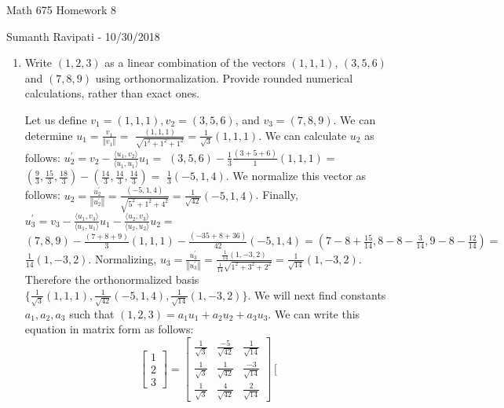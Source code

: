 \documentclass[12pt,letterpaper,reqno]{amsart}
\newcommand{\Norm}[1]{\left\Vert #1 \right \Vert}
\begin{document}
\thispagestyle{empty}
\centerline{\Large Math 675 Homework 8}
\centerline{Sumanth Ravipati - 10/30/2018}
\vspace{.25in}

\begin{enumerate}[1.]
\item Write $(1,2,3)$ as a linear combination of the vectors $(1,1,1)$, $(3,5,6)$ and $(7,8,9)$ using orthonormalization. Provide rounded numerical calculations, rather than exact ones.
\begin{flushleft}
Let us define $v_1 = (1,1,1), v_2 = (3, 5, 6)$, and $v_3 = (7, 8, 9)$. We can determine $u_1 = \frac{v_1}{\Norm{v_1}} = $ $\frac{(1,1,1)}{\sqrt{1^2+1^2+1^2}} = \frac{1}{\sqrt{3}}(1,1,1)$. We can calculate $u_2$ as follows: $u_2^\prime = v_2 - \frac{\langle u_1, v_2 \rangle}{\langle u_1, u_1 \rangle}u_1 = $ $(3, 5, 6) - \frac{1}{3}\frac{(3+5+6)}{1}(1,1,1) =$ $(\frac{9}{3}, \frac{15}{3}, \frac{18}{3}) - (\frac{14}{3}, \frac{14}{3}, \frac{14}{3}) =$ $ \frac{1}{3}(-5,1,4)$. We normalize this vector as follows: $u_2 = \frac{u_2^\prime}{\Norm{u_2^\prime}} = \frac{(-5, 1, 4)}{\sqrt{5^2+1^2+4^2}} = \frac{1}{\sqrt{42}}(-5,1,4)$. Finally, $u_3^\prime = v_3 - \frac{\langle u_1, v_3 \rangle}{\langle u_1, u_1 \rangle}u_1 - \frac{\langle u_2, v_3 \rangle}{\langle u_2, u_2 \rangle}u_2 =$ $(7,8,9) - \frac{(7+8+9)}{3}(1,1,1) - \frac{(-35+8+36)}{42}(-5,1,4) = (7-8+\frac{15}{14}, 8-8-\frac{3}{14}, 9-8-\frac{12}{14}) =$ $\frac{1}{14}(1, -3, 2)$. Normalizing, $u_3 = \frac{u_3^\prime}{\Norm{u_3^\prime}} = \frac{\frac{1}{14}(1, -3, 2)}{\frac{1}{14}\sqrt{1^2+3^2+2^2}} = \frac{1}{\sqrt{14}}(1, -3, 2)$. Therefore the orthonormalized basis $\{\frac{1}{\sqrt{3}}(1,1,1), \frac{1}{\sqrt{42}}(-5,1,4), \frac{1}{\sqrt{14}}(1, -3, 2)\}$. We will next find constants $a_1, a_2, a_3$ such that $(1,2,3) = a_1u_1 + a_2u_2 + a_3u_3$. We can write this equation in matrix form as follows:
$$\left[ \begin{array}{c}
    {1}\\{2}\\{3}
\end{array}\right] =
    \left[ \begin{array}{ccc}
    {\frac{1}{\sqrt{3}}} & {\frac{-5}{\sqrt{42}}} & {\frac{1}{\sqrt{14}}} \\
    {\frac{1}{\sqrt{3}}} & {\frac{1}{\sqrt{42}}} & {\frac{-3}{\sqrt{14}}} \\
    {\frac{1}{\sqrt{3}}} & {\frac{4}{\sqrt{42}}} & {\frac{2}{\sqrt{14}}}
\end{array} \right]
    \left[ \begin{array}{c}

\end{array}$$
\end{flushleft}
\end{enumerate}
\end{document}
